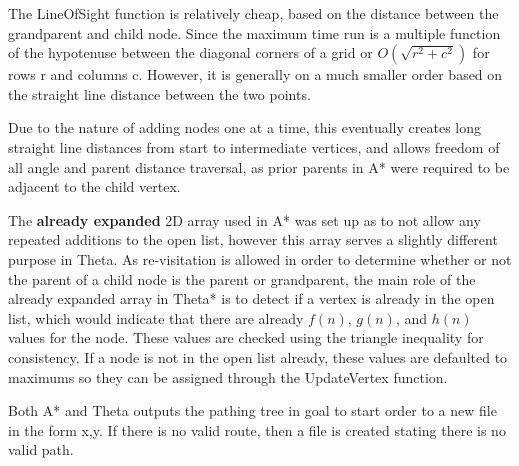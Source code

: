 \documentclass[12pt]{article}
\begin{document}
\begin{enumerate}[label=(\alph*)]
  The LineOfSight function is relatively cheap, based on the distance between the grandparent and child node. Since the maximum time run is a multiple function of the hypotenuse between the diagonal corners of a grid or $O(\sqrt{r^2 + c^2})$ for rows r and columns c.  However, it is generally on a much smaller order based on the straight line distance between the two points. 
  
  Due to the nature of adding nodes one at a time, this eventually creates long straight line distances from start to intermediate vertices, and allows freedom of all angle and parent distance traversal, as prior parents in A* were required to be adjacent to the child vertex. 
  
  The\textbf{ already expanded} 2D array used in A* was set up as to not allow any repeated additions to the open list, however this array serves a slightly different purpose in Theta. As re-visitation is allowed in order to determine whether or not the parent of a child node is the parent or grandparent, the main role of the already expanded array in Theta* is to detect if a vertex is already in the open list, which would indicate that there are already $f(n)$, $g(n)$, and $h(n)$ values for the node. These values are checked using the triangle inequality for consistency. If a node is not in the open list already, these values are defaulted to maximums so they can be assigned through the UpdateVertex function.
  
  Both A* and Theta outputs the pathing tree in goal to start order to a new file in the form x,y. If there is no valid route, then a file is created stating there is no valid path.



\end{enumerate}
\end{document}
